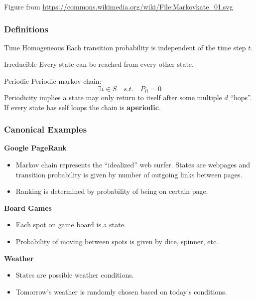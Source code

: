 \documentclass{beamer}
\begin{document}
\begin{frame}
\begin{block}{}
\begin{center}
\begin{tiny}
Figure from \url{https://commons.wikimedia.org/wiki/File:Markovkate_01.svg}
\end{tiny}
\end{center}
\end{block}

\end{frame}


\begin{frame}
\frametitle{Definitions}
\begin{block}{Time Homogeneous}
Each transition probability is independent of the time step $t$.
\end{block}

\begin{block}{Irreducible}
Every state can be reached from every other state.
\end{block}

\begin{block}{Periodic}
Periodic markov chain:
\[ \exists i \in S \quad s.t. \quad P_{ii} = 0\]
Periodicity implies a state may only return to itself after some multiple $d$ ``hops''.  If every state has self loops the chain is \textbf{aperiodic}.
\end{block}

\end{frame}


\begin{frame}
\frametitle{Canonical Examples}

\textbf{Google PageRank}
\begin{itemize}
\item Markov chain represents the ``idealized'' web surfer.  States are webpages and transition probability is given by number of outgoing links between pages.
\item Ranking is determined by probability of being on certain page.
\end{itemize}

\textbf{Board Games}
\begin{itemize}
\item Each spot on game board is a state.
\item Probability of moving between spots is given by dice, spinner, etc.
\end{itemize}

\textbf{Weather}
\begin{itemize}
\item States are possible weather conditions.
\item Tomorrow's weather is randomly chosen based on today's conditions.
\end{itemize}

\end{frame}
\end{document}

